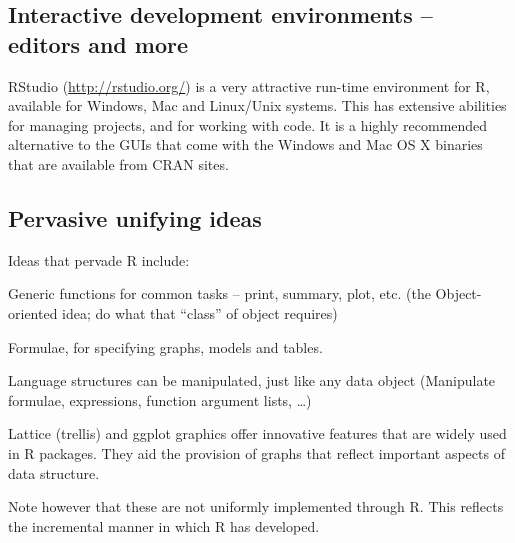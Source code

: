   \subsection*{Interactive development environments -- editors and more}
    RStudio
  (\url{http://rstudio.org/}) is a very attractive run-time
  environment for R, available for Windows, Mac and Linux/Unix
  systems.  This has extensive abilities for managing projects, and
  for working with code.  It is a highly recommended alternative to
  the GUIs that come with the Windows and Mac OS X binaries that are
  available from CRAN sites.

\subsection*{Pervasive unifying ideas}
Ideas that pervade R include:\\[-8pt]
\begin{list}{}{\setlength{\itemsep}{1pt} \setlength{\parsep}{1pt}}
\item[] Generic functions for common tasks -- print, summary, plot, etc.
(the Object-oriented idea; do what that ``class'' of object requires)

\item[] Formulae, for specifying graphs, models and tables.

\item[] Language structures can be manipulated, just like any
data object (Manipulate formulae, expressions, function argument
lists, \dots)

\item[] Lattice (trellis) and ggplot graphics offer innovative
  features that are widely used in R packages.  They aid the provision
  of graphs that reflect important aspects of data structure.

\end{list}
Note however that these are not uniformly implemented through R.
This reflects the incremental manner in which R has developed.

